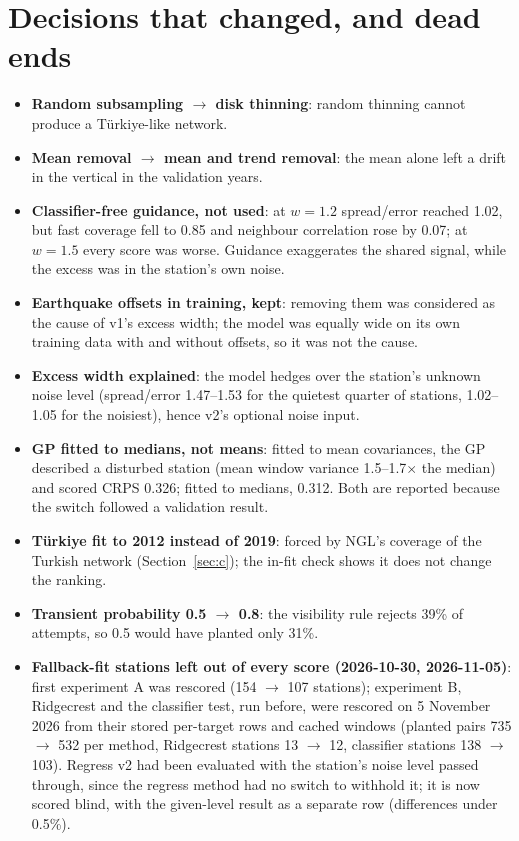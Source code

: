 \documentclass[11pt,a4paper]{article}
\begin{document}
\section{Decisions that changed, and dead ends}
\label{sec:dead}

\begin{itemize}
\item \textbf{Random subsampling $\to$ disk thinning}: random thinning cannot produce a Türkiye-like network.
\item \textbf{Mean removal $\to$ mean and trend removal}: the mean alone left a drift in the vertical in the validation years.
\item \textbf{Classifier-free guidance, not used}: at $w = 1.2$ spread/error reached 1.02, but fast coverage fell to 0.85 and neighbour correlation rose by 0.07; at $w = 1.5$ every score was worse. Guidance exaggerates the shared signal, while the excess was in the station's own noise.
\item \textbf{Earthquake offsets in training, kept}: removing them was considered as the cause of v1's excess width; the model was equally wide on its own training data with and without offsets, so it was not the cause.
\item \textbf{Excess width explained}: the model hedges over the station's unknown noise level (spread/error 1.47–1.53 for the quietest quarter of stations, 1.02–1.05 for the noisiest), hence v2's optional noise input.
\item \textbf{GP fitted to medians, not means}: fitted to mean covariances, the GP described a disturbed station (mean window variance 1.5–1.7$\times$ the median) and scored CRPS 0.326; fitted to medians, 0.312. Both are reported because the switch followed a validation result.
\item \textbf{Türkiye fit to 2012 instead of 2019}: forced by NGL's coverage of the Turkish network (Section~\ref{sec:c}); the in-fit check shows it does not change the ranking.
\item \textbf{Transient probability 0.5 $\to$ 0.8}: the visibility rule rejects 39\% of attempts, so 0.5 would have planted only 31\%.
\item \textbf{Fallback-fit stations left out of every score (2026-10-30, 2026-11-05)}: first experiment A was rescored (154 $\to$ 107 stations); experiment B, Ridgecrest and the classifier test, run before, were rescored on 5 November 2026 from their stored per-target rows and cached windows (planted pairs 735 $\to$ 532 per method, Ridgecrest stations 13 $\to$ 12, classifier stations 138 $\to$ 103). Regress v2 had been evaluated with the station's noise level passed through, since the regress method had no switch to withhold it; it is now scored blind, with the given-level result as a separate row (differences under 0.5\%).

\end{itemize}
\end{document}
